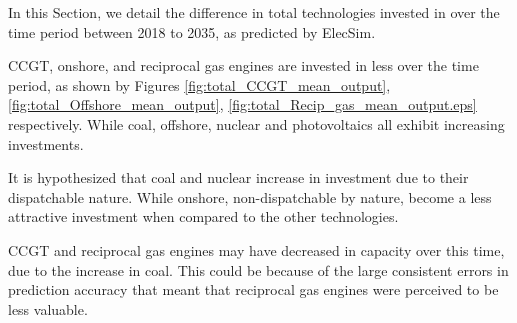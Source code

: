 \documentclass[final,3p,times,twocolumn,numbers]{elsarticle}
\begin{document}
In this Section, we detail the difference in total technologies invested in over the time period between 2018 to 2035, as predicted by ElecSim.

CCGT, onshore, and reciprocal gas engines are invested in less over the time period, as shown by Figures \ref{fig:total_CCGT_mean_output}, \ref{fig:total_Offshore_mean_output}, \ref{fig:total_Recip_gas_mean_output.eps} respectively. While coal, offshore, nuclear and photovoltaics all exhibit increasing investments.

It is hypothesized that coal and nuclear increase in investment due to their dispatchable nature. While onshore, non-dispatchable by nature, become a less attractive investment when compared to the other technologies.

CCGT and reciprocal gas engines may have decreased in capacity over this time, due to the increase in coal. This could be because of the large consistent errors in prediction accuracy that meant that reciprocal gas engines were perceived to be less valuable.
\end{document}
